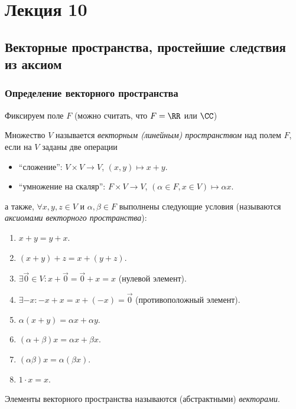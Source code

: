 \section{Лекция 10}

\subsection{Векторные пространства, простейшие следствия из аксиом}

\subsubsection{Определение векторного пространства}

Фиксируем поле $F$ (можно считать, что $F = \RR$ или $\CC$)

\begin{definition}
    Множество $V$ называется \textit{векторным (линейным) пространством} над полем $F$, если на $V$ заданы две операции
    \begin{itemize}[nosep]
    \item ``сложение'': $V \times V \to V$, $(x, y) \mapsto x + y$.
    \item ``умножение на скаляр'': $F \times V \to V$, $(\alpha \in F, x \in V) \mapsto \alpha x$.
    \end{itemize}
    а также, $\forall x, y, z \in V$ и $\alpha, \beta \in F$ выполнены следующие условия (называются \textit{аксиомами векторного пространства}):
    \begin{enumerate}[nosep]
    \item $x + y = y + x$.
    \item $(x + y) + z = x + (y + z)$.
    \item $\exists \overrightarrow{0} \in V : x + \overrightarrow{0} = \overrightarrow{0} + x = x$ (нулевой элемент).
    \item $\exists -x : -x + x = x + (-x) = \overrightarrow{0}$ (противоположный элемент).
    \item $\alpha(x + y) = \alpha x + \alpha y$.
    \item $(\alpha + \beta)x = \alpha x + \beta x$.
    \item $(\alpha \beta)x = \alpha(\beta x)$.
    \item $1 \cdot x = x$.
    \end{enumerate}
\end{definition}

\begin{definition}
    Элементы векторного пространства называются (абстрактными) \textit{векторами}.
\end{definition}

